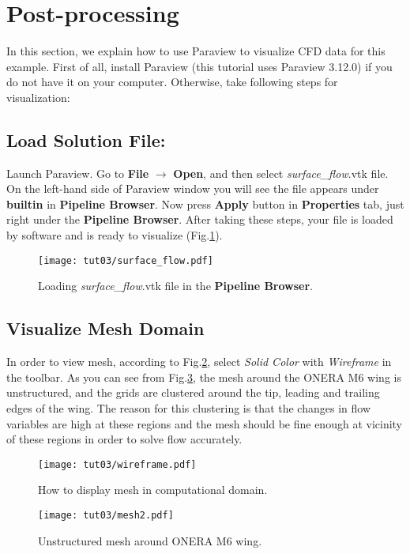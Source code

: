 \section{Post-processing}
In this section, we explain how to use Paraview to visualize CFD data for this example. First of all, install Paraview (this tutorial uses Paraview 3.12.0) if you do not have it on your computer. Otherwise, take following steps for visualization:
\subsection{Load Solution File:}
Launch Paraview. Go to \textbf{File} $\rightarrow$ \textbf{Open}, and then select \textit{surface\_flow}.vtk file. On the left-hand side of Paraview window you will see the file appears under \textbf{builtin} in \textbf{Pipeline Browser}. Now press \textbf{Apply} button in \textbf{Properties} tab, just right under the  \textbf{Pipeline Browser}. After taking these steps, your file is loaded by software and is ready to visualize (Fig.\ref{fig3:load}).
\begin{figure}[htbp]
    \centering
    \texttt{[image: tut03/surface\_flow.pdf]}
    \caption{Loading \textit{surface\_flow}.vtk file in the \textbf{Pipeline Browser}.}
    \label{fig3:load}
\end{figure}
\subsection{Visualize Mesh Domain}
In order to view mesh, according to Fig.\ref{fig3:wireframe}, select \textit{Solid Color} with \textit{Wireframe} in the toolbar. As you can see from Fig.\ref{fig3:mesh}, the mesh around the ONERA M6 wing is unstructured, and the grids are clustered around the tip, leading and trailing edges of the wing. The reason for this clustering is that the changes in flow variables are high at these regions and the mesh should be fine enough at vicinity of these regions in order to solve flow accurately.
\begin{figure}[htbp]
    \centering
    \texttt{[image: tut03/wireframe.pdf]}
    \caption{How to display mesh in computational domain.}
    \label{fig3:wireframe}
\end{figure}
\begin{figure}[htbp]
    \centering
    \texttt{[image: tut03/mesh2.pdf]}
    \caption{Unstructured mesh around ONERA M6 wing.}
    \label{fig3:mesh}
\end{figure}
